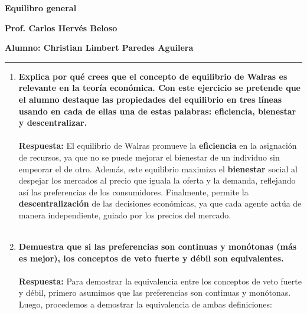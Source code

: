 \begin{center}
    \textbf{Equilibro general}
\end{center}

\begin{center}
\textbf{Prof. Carlos Hervés Beloso}
\end{center}

\begin{center}
\textbf{Alumno: Christian Limbert Paredes Aguilera}
\end{center}

\begin{center}
	\rule{0.5\textwidth}{0.4pt}
\end{center}
\vspace{1cm}

\begin{enumerate}

    \item \textbf{Explica por qué crees que el concepto de equilibrio de Walras es relevante en la teoría económica. Con este ejercicio se pretende que el alumno destaque las propiedades del equilibrio en tres líneas usando en cada de ellas una de estas palabras: eficiencia, bienestar y descentralizar.}\\\\
	\textbf{Respuesta:} El equilibrio de Walras promueve la \textbf{eficiencia} en la asignación de recursos, ya que no se puede mejorar el bienestar de un individuo sin empeorar el de otro. Además, este equilibrio maximiza el \textbf{bienestar} social al despejar los mercados al precio que iguala la oferta y la demanda, reflejando así las preferencias de los consumidores. Finalmente, permite la \textbf{descentralización} de las decisiones económicas, ya que cada agente actúa de manera independiente, guiado por los precios del mercado.\\\\

    \item \textbf{Demuestra que si las preferencias son continuas y monótonas (más es mejor), los conceptos de veto fuerte y débil son equivalentes.}\\\\
	\textbf{Respuesta:} Para demostrar la equivalencia entre los conceptos de veto fuerte y débil, primero asumimos que las preferencias son continuas y monótonas. Luego, procedemos a demostrar la equivalencia de ambas definiciones:\\


\end{enumerate}
